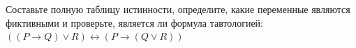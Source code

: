 \question Составьте полную таблицу истинности, определите, какие переменные являются фиктивными и проверьте, является ли формула тавтологией:
$((P \rightarrow Q) \lor R) \leftrightarrow (P \rightarrow (Q \lor R))$
